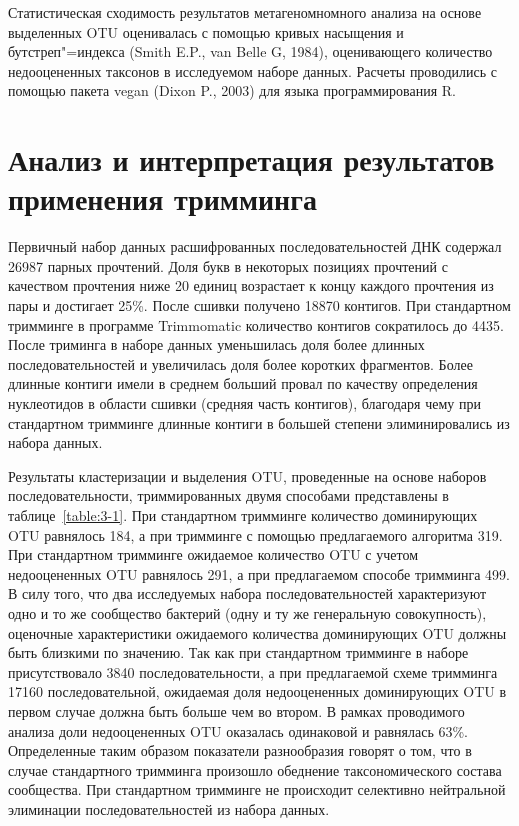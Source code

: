 \documentclass[a4paper,12pt,openany,final]{extreport}
\begin{document}
Статистическая сходимость результатов метагеномномного анализа на основе выделенных OTU оценивалась с помощью кривых насыщения и бутстреп"=индекса (Smith E.P., van Belle G, 1984), оценивающего количество недооцененных таксонов в исследуемом наборе данных. Расчеты проводились с помощью пакета vegan (Dixon P., 2003) для языка программирования R.

\section{Анализ и интерпретация результатов применения тримминга}

Первичный набор данных расшифрованных последовательностей ДНК содержал 26987 парных прочтений.  Доля букв в некоторых позициях прочтений с качеством прочтения ниже 20 единиц возрастает к концу каждого прочтения из пары и достигает 25\%.  После сшивки получено 18870 контигов. При стандартном тримминге в программе Trimmomatic количество контигов сократилось до 4435. После триминга в наборе данных уменьшилась доля более длинных последовательностей и увеличилась доля более коротких фрагментов. Более длинные контиги имели в среднем больший провал по качеству определения нуклеотидов в области сшивки (средняя часть контигов), благодаря чему при стандартном тримминге длинные контиги в большей степени элиминировались из набора данных.

Результаты кластеризации и выделения OTU, проведенные на основе наборов последовательности, триммированных двумя способами представлены в таблице~\ref{table:3-1}. При стандартном тримминге количество доминирующих OTU равнялось 184, а при тримминге с помощью предлагаемого алгоритма 319. При стандартном тримминге ожидаемое количество OTU с учетом недооцененных OTU равнялось 291, а при предлагаемом способе тримминга 499. В силу того, что два исследуемых набора последовательностей характеризуют одно и то же сообщество бактерий (одну и ту же генеральную совокупность), оценочные характеристики ожидаемого количества доминирующих OTU должны быть близкими по значению. Так как при стандартном тримминге в наборе присутствовало 3840 последовательности, а при предлагаемой схеме тримминга 17160 последовательной, ожидаемая доля недооцененных доминирующих OTU в первом случае должна быть больше чем во втором. В рамках проводимого анализа доли недооцененных OTU оказалась одинаковой и равнялась 63\%. Определенные таким образом показатели разнообразия говорят о том, что в случае стандартного тримминга произошло обеднение таксономического состава сообщества. При стандартном тримминге не происходит селективно нейтральной элиминации последовательностей из набора данных.
\end{document}
